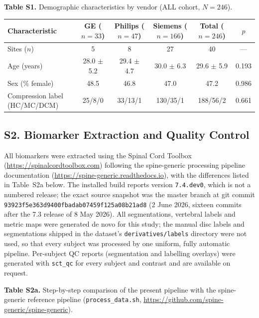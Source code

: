 \documentclass[12pt,a4paper]{article}
\begin{document}
\textbf{Table S1.} Demographic characteristics by vendor (ALL cohort, $N=246$).

\vspace{4mm}
\begin{table}[H]
\centering
\footnotesize
\setlength{\tabcolsep}{2.5pt}
\begin{tabular}{lccccc}
\toprule
\textbf{Characteristic} & \textbf{GE ($n=33$)} & \textbf{Philips ($n=47$)} & \textbf{Siemens ($n=166$)} & \textbf{Total ($n=246$)} & \textbf{$p$} \\
\midrule
Sites ($n$)         & 5 & 8 & 27 & 40 & --- \\
Age (years)         & 28.0 $\pm$ 5.2 & 29.4 $\pm$ 4.7 & 30.0 $\pm$ 6.3 & 29.6 $\pm$ 5.9 & 0.193 \\
Sex (\% female)      & 48.5 & 46.8 & 47.0 & 47.2 & 0.986 \\
Compression label (HC/MC/DCM) & 25/8/0 & 33/13/1 & 130/35/1 & 188/56/2 & 0.661 \\
\bottomrule
\end{tabular}
\end{table}

\subsection*{S2. Biomarker Extraction and Quality Control}

All biomarkers were extracted using the Spinal Cord Toolbox (\url{https://spinalcordtoolbox.com}) following the spine-generic processing pipeline documentation (\url{https://spine-generic.readthedocs.io}), with the differences listed in Table~S2a below. The installed build reports version \texttt{7.4.dev0}, which is not a numbered release; the exact source snapshot was the master branch at git commit \texttt{93923f5e363d9400fbadab07459f125a08b21ad8} (2 June 2026, sixteen commits after the 7.3 release of 8 May 2026). All segmentations, vertebral labels and metric maps were generated de novo for this study; the manual disc labels and segmentations shipped in the dataset's \texttt{derivatives/labels} directory were not used, so that every subject was processed by one uniform, fully automatic pipeline. Per-subject QC reports (segmentation and labelling overlays) were generated with \texttt{sct\_qc} for every subject and contrast and are available on request.

\textbf{Table S2a.} Step-by-step comparison of the present pipeline with the spine-generic reference pipeline (\texttt{process\_data.sh}, \url{https://github.com/spine-generic/spine-generic}).
\end{document}
